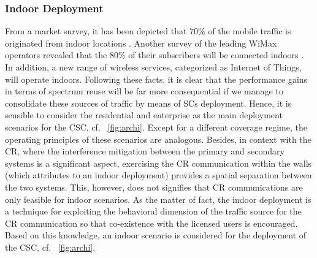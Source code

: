 \subsubsection*{Indoor Deployment}
From a market survey, it has been depicted that $70\%$ of the mobile traffic is originated from indoor locations \cite{Chander08}. Another survey of the leading WiMax operators revealed that the $80\%$ of their subscribers will be connected indoors \cite{Pao07}. In addition, a new range of wireless services, categorized as Internet of Things, will operate indoors. Following these facts, it is clear that the performance gains in terms of spectrum reuse will be far more consequential if we manage to consolidate these sources of traffic by means of SCs deployment. Hence, it is sensible to consider the residential and enterprise as the main deployment scenarios for the CSC, cf. \figurename~\ref{fig:archi}. Except for a different coverage regime, the operating principles of these scenarios are analogous. Besides, in context with the CR, where the interference mitigation between the primary and secondary systems is a significant aspect, exercising the CR communication within the walls (which attributes to an indoor deployment) provides a spatial separation between the two systems. This, however, does not signifies that CR communications are only feasible for indoor scenarios. As the matter of fact, the indoor deployment is a technique for exploiting the behavioral dimension of the traffic source for the CR communication so that co-existence with the licensed users is encouraged. 
Based on this knowledge, an indoor scenario is considered for the deployment of the CSC, cf. \figurename~\ref{fig:archi}.  

